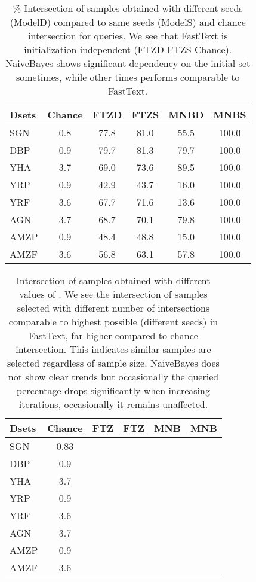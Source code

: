 \documentclass[11pt,a4paper]{article}
\begin{document}
\begin{table}[t]
\small\addtolength{\tabcolsep}{-4pt}
\centering
\begin{tabular}{|l|c||c|c||c|c|}
\hline
Dsets & Chance & FTZD & FTZS & MNBD & MNBS\\ \hline
SGN & 0.8 &  77.8 & 81.0 & 55.5 & 100.0 \\ \hline 
DBP & 0.9 &  79.7 & 81.3  & 79.7 & 100.0 \\ \hline
YHA & 3.7 & 69.0 & 73.6  & 89.5 & 100.0 \\ \hline 
YRP & 0.9 &  42.9 & 43.7  & 16.0 & 100.0 \\ \hline 
YRF & 3.6 &  67.7 & 71.6  & 13.6 & 100.0 \\ \hline 
AGN & 3.7 &  68.7 & 70.1  & 79.8 & 100.0 \\ \hline 
AMZP & 0.9 &  48.4 & 48.8  & 15.0 & 100.0 \\ \hline 
AMZF & 3.6 &  56.8 & 63.1  & 57.8 & 100.0 \\ \hline
\end{tabular}
\caption{\% Intersection of samples obtained with different seeds (ModelD) compared to same seeds (ModelS) and chance intersection for  queries. We see that FastText is initialization independent (FTZD  FTZS   Chance). NaiveBayes shows significant dependency on the initial set sometimes, while other times performs comparable to FastText.} 
\label{tab:seed_bias}
\end{table}
\begin{table*}[t]
\vspace*{-0.2cm}
\small\addtolength{\tabcolsep}{-4pt}
\centering
\begin{tabular}{|l|c||c|c||c|c|}
\hline
Dsets & Chance & FTZ  & FTZ  & MNB  & MNB \\ \hline
SGN & 0.83  &  &  &  &  \\ \hline 
DBP & 0.9 &  &  &   &  \\ \hline
YHA & 3.7 &  &  &  &  \\ \hline 
YRP & 0.9 &  &  &  & \\ \hline 
YRF & 3.6 &  &  &  &  \\ \hline 
AGN & 3.7 &  &  &  &  \\ \hline 
AMZP & 0.9 &  &  &  & \\ \hline 
AMZF & 3.6 &  &  &  & \\ \hline
\end{tabular}
\caption{Intersection of samples obtained with different values of . We see the intersection of samples selected with different number of intersections comparable to highest possible (different seeds) in FastText, far higher compared to chance intersection. This indicates similar samples are selected regardless of sample size. NaiveBayes does not show clear trends but occasionally the queried percentage drops significantly when increasing iterations, occasionally it remains unaffected.} 
\label{tab:sampling_bias}
\end{table*}
\end{document}
